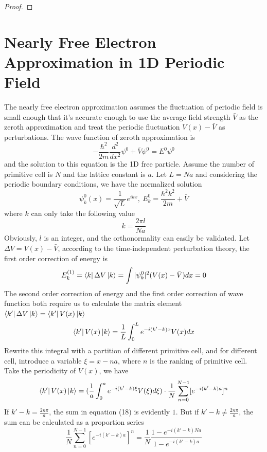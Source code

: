 \documentclass{article}
\begin{document}
\begin{proof}
\end{proof}
\section{Nearly Free Electron Approximation in 1D Periodic Field}
The nearly free electron approximation assumes the fluctuation of periodic field is small enough that it's accurate enough to use the average field strength $\bar{V}$ as the zeroth approximation and treat the periodic fluctuation $V(x)-\bar{V}$ as perturbations. The wave function of zeroth approximation is\begin{equation}
    -\frac{\hbar^2}{2m}\frac{d^2}{dx^2}\psi^0+\bar{V}\psi^0=E^0\psi^0
\end{equation}
and the solution to this equation is the 1D free particle. Assume the number of primitive cell is $N$ and the lattice constant is $a$. Let $L=Na$ and considering the periodic boundary conditions, we have the normalized solution\begin{equation}
    \psi_k^0(x)=\frac{1}{\sqrt{L}}e^{ikx},~E_k^0=\frac{\hbar^2k^2}{2m}+\bar{V}
\end{equation}
where $k$ can only take the following value\begin{equation}
    k=\frac{2\pi{l}}{Na}
\end{equation}
Obviously, $l$ is an integer, and the orthonormality can easily be validated. Let $\Delta{V}=V(x)-\bar{V}$, according to the time-independent perturbation theory, the first order correction of energy is\begin{equation}
    E_k^{(1)}=\bra{k}\Delta{V}\ket{k}=\int|\psi_k^0|^2(V(x)-\bar{V})dx=0
\end{equation}
The second order correction of energy and the first order correction of wave function both require us to calculate the matrix element $\bra{k'}\Delta{V}\ket{k}=\bra{k'}V(x)\ket{k}$\begin{equation}
    \bra{k'}V(x)\ket{k}=\frac{1}{L}\int_{0}^{L}e^{-i(k'-k)x}V(x)dx
\end{equation}
Rewrite this integral with a partition of different primitive cell, and for different cell, introduce a variable $\xi=x-na$, where $n$ is the ranking of primitive cell. Take the periodicity of $V(x)$, we have\begin{equation}
    \bra{k'}V(x)\ket{k}=(\frac{1}{a}\int_0^{a}e^{-i(k'-k)\xi}V(\xi)d\xi)\cdot\frac{1}{N}\sum_{n=0}^{N-1}[e^{-i(k'-k)a}]^n
\end{equation}
If $k'-k=\frac{2n\pi}{a}$, the sum in equation (18) is evidently $1$. But if $k'-k\neq\frac{2n\pi}{a}$, the sum can be calculated as a proportion series\begin{equation}
    \frac{1}{N}\sum_{n=0}^{N-1}[e^{-i(k'-k)a}]^n=\frac{1}{N}\frac{1-e^{-i(k'-k)Na}}{1-e^{-i(k'-k)a}}
\end{equation}
\end{document}
